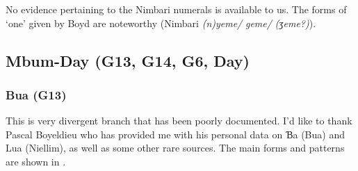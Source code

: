 No evidence pertaining to the Nimbari numerals is available to us. The forms of ‘one’ given by Boyd \citep{Boyd1989} are noteworthy (Nimbari \textit{(n)yeme/} \textit{geme/} \textit{(ʒeme?)}).

 
\subsection{Mbum-Day (G13, G14, G6, Day)}%
\subsubsection{Bua (G13)} %
This is very divergent branch that has been poorly documented. I'd like to thank Pascal Boyeldieu who has provided me with his personal data on Ɓa (Bua) and Lua (Niellim),  as well as some other rare sources. The main forms and patterns are shown in .

